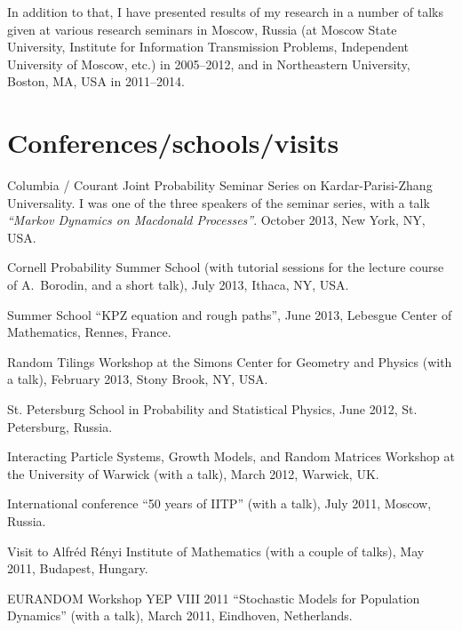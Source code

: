 \documentclass[letterpaper,11pt]{article}
\begin{document}
In addition to that, I have presented results of my research in a number of talks given at various research seminars in Moscow, Russia (at Moscow State University, Institute for Information Transmission Problems, Independent University of Moscow, etc.) in 2005--2012, and in Northeastern University, Boston, MA, USA in 2011--2014.

\section*{Conferences/schools/visits}

\begin{etaremune}

\item
Columbia / Courant Joint Probability Seminar Series on Kardar-Parisi-Zhang Universality. 
I was one of the three speakers of the seminar series,
with a talk
\emph{``Markov Dynamics on Macdonald Processes''}.
October 2013, New York, NY, USA.


\item
Cornell Probability Summer School (with tutorial sessions for the lecture course of 
A.~Borodin, and a short talk), July 2013, Ithaca, NY, USA.

\item Summer School ``KPZ equation and rough paths'', 
June 2013, 
Lebesgue Center of Mathematics, Rennes, France.

\item 
Random Tilings Workshop at the 
Simons Center for Geometry and Physics (with a talk),
February 2013, Stony Brook, NY, USA.


\item St. Petersburg School in Probability and Statistical Physics, June 2012, St. Petersburg, Russia.

\item 
Interacting Particle Systems, Growth Models, and Random Matrices Workshop at the University of Warwick (with a talk), March 2012, Warwick, UK.

\item International conference ``50 years of IITP'' (with a talk), July 2011, Moscow, Russia.
  
\item Visit to Alfr\'ed R\'enyi Institute of Mathematics (with a couple of talks), May 2011, Budapest, Hungary.

\item EURANDOM Workshop YEP VIII 2011 ``Stochastic Models for Population Dynamics'' (with a talk), March 2011, Eindhoven, Netherlands.


\end{etaremune}
\end{document}
